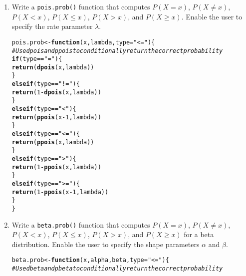 \documentclass{article}\usepackage[]{graphicx}\usepackage[]{xcolor}
\makeatletter
\newcommand{\hlnum}[1]{\textcolor[rgb]{0.686,0.059,0.569}{#1}}%
\newcommand{\hlsng}[1]{\textcolor[rgb]{0.192,0.494,0.8}{#1}}%
\newcommand{\hlcom}[1]{\textcolor[rgb]{0.678,0.584,0.686}{\textit{#1}}}%
\newcommand{\hlopt}[1]{\textcolor[rgb]{0,0,0}{#1}}%
\newcommand{\hldef}[1]{\textcolor[rgb]{0.345,0.345,0.345}{#1}}%
\newcommand{\hlkwa}[1]{\textcolor[rgb]{0.161,0.373,0.58}{\textbf{#1}}}%
\newcommand{\hlkwb}[1]{\textcolor[rgb]{0.69,0.353,0.396}{#1}}%
\newcommand{\hlkwc}[1]{\textcolor[rgb]{0.333,0.667,0.333}{#1}}%
\newcommand{\hlkwd}[1]{\textcolor[rgb]{0.737,0.353,0.396}{\textbf{#1}}}%
\newenvironment{kframe}{%
 \def\at@end@of@kframe{}%
 \ifinner\ifhmode%
  \def\at@end@of@kframe{\end{minipage}}%
  \begin{minipage}{\columnwidth}%
 \fi\fi%
 \def\FrameCommand##1{\hskip\@totalleftmargin \hskip-\fboxsep
 \colorbox{shadecolor}{##1}\hskip-\fboxsep
     \hskip-\linewidth \hskip-\@totalleftmargin \hskip\columnwidth}%
 \MakeFramed {\advance\hsize-\width
   \@totalleftmargin\z@ \linewidth\hsize
   \@setminipage}}%
 {\par\unskip\endMakeFramed%
 \at@end@of@kframe}
\newenvironment{knitrout}{}{} %
\makeatother
\begin{document}
  \begin{enumerate}
    \item Write a \texttt{pois.prob()} function that computes $P(X=x)$, 
    $P(X \neq x)$, $P(X<x)$, $P(X \leq x)$, $P(X > x)$, and $P(X \geq x).$ Enable the user to specify the rate parameter $\lambda$.
\begin{knitrout}\scriptsize
{}\color{fgcolor}\begin{kframe}
\begin{alltt}
\hldef{pois.prob} \hlkwb{<-} \hlkwa{function}\hldef{(}\hlkwc{x}\hldef{,} \hlkwc{lambda}\hldef{,} \hlkwc{type}\hldef{=}\hlsng{"<="}\hldef{)\{}
  \hlcom{# Use dpois and ppois to conditionally return the correct probability}
  \hlkwa{if} \hldef{(type} \hlopt{==} \hlsng{"="}\hldef{)\{}
    \hlkwd{return}\hldef{(}\hlkwd{dpois}\hldef{(x, lambda))}
  \hldef{\}}
  \hlkwa{else if} \hldef{(type} \hlopt{==} \hlsng{"!="}\hldef{)\{}
    \hlkwd{return}\hldef{(}\hlnum{1} \hlopt{-} \hlkwd{dpois}\hldef{(x, lambda))}
  \hldef{\}}
  \hlkwa{else if} \hldef{(type} \hlopt{==} \hlsng{"<"}\hldef{)\{}
    \hlkwd{return}\hldef{(}\hlkwd{ppois}\hldef{(x} \hlopt{-} \hlnum{1}\hldef{, lambda))}
  \hldef{\}}
  \hlkwa{else if} \hldef{(type} \hlopt{==} \hlsng{"<="}\hldef{)\{}
    \hlkwd{return}\hldef{(}\hlkwd{ppois}\hldef{(x, lambda))}
  \hldef{\}}
  \hlkwa{else if} \hldef{(type} \hlopt{==} \hlsng{">"}\hldef{)\{}
    \hlkwd{return}\hldef{(}\hlnum{1} \hlopt{-} \hlkwd{ppois}\hldef{(x, lambda))}
  \hldef{\}}
  \hlkwa{else if} \hldef{(type} \hlopt{==} \hlsng{">="}\hldef{)\{}
    \hlkwd{return}\hldef{(}\hlnum{1} \hlopt{-} \hlkwd{ppois}\hldef{(x} \hlopt{-} \hlnum{1}\hldef{, lambda))}
  \hldef{\}}
\hldef{\}}
\end{alltt}
\end{kframe}
\end{knitrout}
    \item Write a \texttt{beta.prob()} function that computes $P(X=x)$, 
    $P(X \neq x)$, $P(X<x)$, $P(X \leq x)$, $P(X > x)$, and $P(X \geq x)$
    for a beta distribution. Enable the user to specify the shape parameters
    $\alpha$ and $\beta$.
\begin{knitrout}\scriptsize
{}\color{fgcolor}\begin{kframe}
\begin{alltt}
\hldef{beta.prob} \hlkwb{<-} \hlkwa{function}\hldef{(}\hlkwc{x}\hldef{,} \hlkwc{alpha}\hldef{,} \hlkwc{beta}\hldef{,} \hlkwc{type}\hldef{=}\hlsng{"<="}\hldef{)\{}
  \hlcom{# Use dbeta and pbeta to conditionally return the correct probability}


\end{alltt}
\end{kframe}
\end{knitrout}
\end{enumerate}
\end{document}
